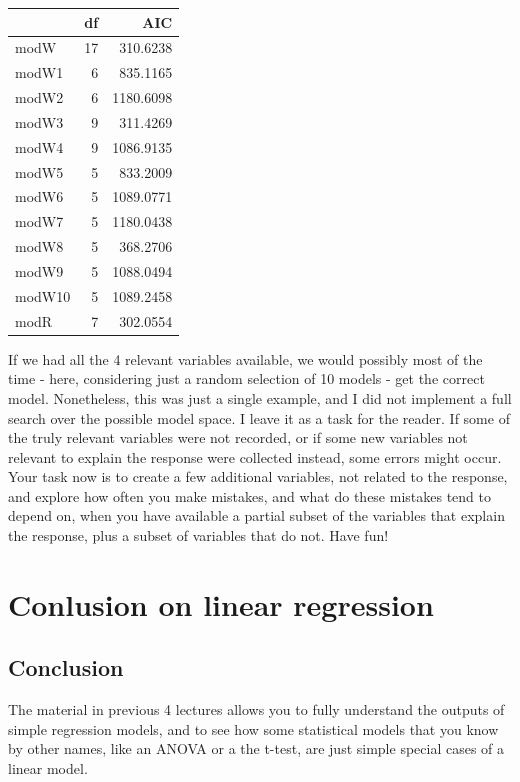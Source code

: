 \documentclass[
]{book}
\begin{document}
\begin{tabular}{l|r|r}
\hline
  & df & AIC\\
\hline
modW & 17 & 310.6238\\
\hline
modW1 & 6 & 835.1165\\
\hline
modW2 & 6 & 1180.6098\\
\hline
modW3 & 9 & 311.4269\\
\hline
modW4 & 9 & 1086.9135\\
\hline
modW5 & 5 & 833.2009\\
\hline
modW6 & 5 & 1089.0771\\
\hline
modW7 & 5 & 1180.0438\\
\hline
modW8 & 5 & 368.2706\\
\hline
modW9 & 5 & 1088.0494\\
\hline
modW10 & 5 & 1089.2458\\
\hline
modR & 7 & 302.0554\\
\hline
\end{tabular}

If we had all the 4 relevant variables available, we would possibly most of the time - here, considering just a random selection of 10 models - get the correct model. Nonetheless, this was just a single example, and I did not implement a full search over the possible model space. I leave it as a task for the reader. If some of the truly relevant variables were not recorded, or if some new variables not relevant to explain the response were collected instead, some errors might occur. Your task now is to create a few additional variables, not related to the response, and explore how often you make mistakes, and what do these mistakes tend to depend on, when you have available a partial subset of the variables that explain the response, plus a subset of variables that do not. Have fun!

\hypertarget{conlusion-on-linear-regression}{%
\chapter{Conlusion on linear regression}\label{conlusion-on-linear-regression}}

\hypertarget{conclusion}{%
\section{Conclusion}\label{conclusion}}

The material in previous 4 lectures allows you to fully understand the outputs of simple regression models, and to see how some statistical models that you know by other names, like an ANOVA or a the t-test, are just simple special cases of a linear model.
\end{document}
